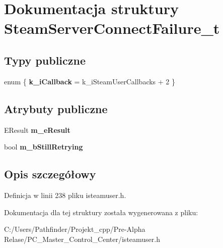 \hypertarget{struct_steam_server_connect_failure__t}{}\section{Dokumentacja struktury Steam\+Server\+Connect\+Failure\+\_\+t}
\label{struct_steam_server_connect_failure__t}
\subsection*{Typy publiczne}
\begin{DoxyCompactItemize}
\item 
\mbox{\label{struct_steam_server_connect_failure__t_adebe4e006a66bd25d8f5eea9c6ce1eac}} 
enum \{ {\bfseries k\+\_\+i\+Callback} = k\+\_\+i\+Steam\+User\+Callbacks + 2
 \}
\end{DoxyCompactItemize}
\subsection*{Atrybuty publiczne}
\begin{DoxyCompactItemize}
\item 
\mbox{\label{struct_steam_server_connect_failure__t_ace559dfc315833e05e738424f526c215}} 
E\+Result {\bfseries m\+\_\+e\+Result}
\item 
\mbox{\label{struct_steam_server_connect_failure__t_a9ebb3feba5dd37951866d760b72c6305}} 
bool {\bfseries m\+\_\+b\+Still\+Retrying}
\end{DoxyCompactItemize}


\subsection{Opis szczegółowy}


Definicja w linii 238 pliku isteamuser.\+h.



Dokumentacja dla tej struktury została wygenerowana z pliku\+:\begin{DoxyCompactItemize}
\item 
C\+:/\+Users/\+Pathfinder/\+Projekt\+\_\+cpp/\+Pre-\/\+Alpha Relase/\+P\+C\+\_\+\+Master\+\_\+\+Control\+\_\+\+Center/isteamuser.\+h\end{DoxyCompactItemize}
